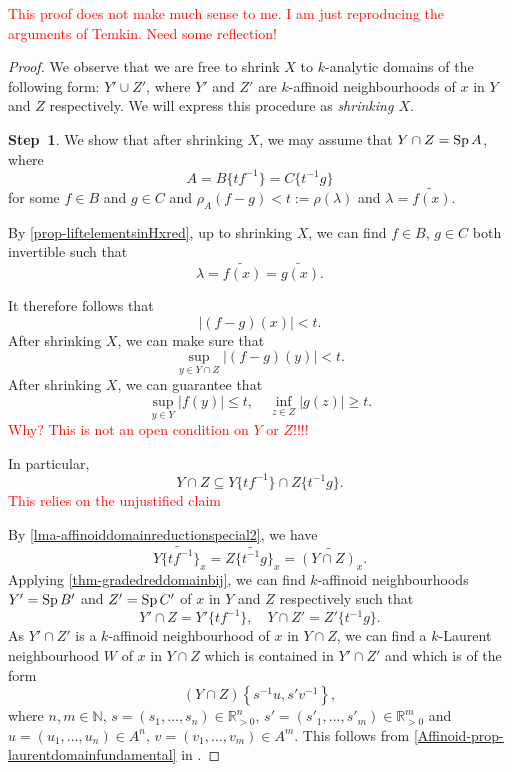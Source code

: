 \textcolor{red}{This proof does not make much sense to me. I am just reproducing the arguments of Temkin. Need some reflection!}


\begin{proof}
    We observe that we are free to shrink $X$ to $k$-analytic domains of the following form: $Y'\cup Z'$, where $Y'$ and $Z'$ are $k$-affinoid neighbourhoods of $x$ in $Y$ and $Z$ respectively. We will express this procedure as \emph{shrinking $X$}.

    \textbf{Step~1}. We show that after shrinking $X$, we may assume that $Y\cap Z=\operatorname{Sp} A$, where
    \[
        A=B\{tf^{-1}\}=C\{t^{-1}g\}  
    \]
    for some $f\in B$ and $g\in C$ and $\rho_A(f-g)<t:=\rho(\lambda)$ and $\lambda=\widetilde{f(x)}$.



    By \cref{prop-liftelementsinHxred}, up to shrinking $X$, we can find $f\in B$, $g\in C$ both invertible such that 
    \[
        \lambda=\widetilde{f(x)}=\widetilde{g(x)}.
    \]
     

    It therefore follows that 
    \[
        |(f-g)(x)|<t.  
    \] 
    After shrinking $X$, we can make sure that 
    \[
        \sup_{y\in Y\cap Z}|(f-g)(y)|<t.
    \]
    After shrinking $X$, we can guarantee that
    \[
        \sup_{y\in Y} |f(y)|\leq t,\quad \inf_{z\in Z}|g(z)|\geq t.
    \]
     \textcolor{red}{Why? This is not an open condition on $Y$ or $Z$!!!!}  
    
    In particular,
    \[  
        Y\cap Z\subseteq Y\{tf^{-1}\}\cap Z\{t^{-1}g\}.
    \]
    \textcolor{red}{This relies on the unjustified claim}

    By \cref{lma-affinoiddomainreductionspecial2}, we have
    \[
        \widetilde{Y\{tf^{-1}\}_x}= \widetilde{Z\{t^{-1}g\}_x}= \widetilde{(Y\cap Z)_x}.
    \]
    Applying \cref{thm-gradedreddomainbij}, we can find $k$-affinoid neighbourhoods $Y'=\operatorname{Sp} B'$ and $Z'=\operatorname{Sp} C'$ of $x$ in $Y$ and $Z$ respectively such that
    \[
        Y'\cap Z=Y'\{tf^{-1}\},\quad Y\cap Z'=Z'\{t^{-1}g\}. 
    \]
    As $Y'\cap Z'$ is a $k$-affinoid neighbourhood of $x$ in $Y\cap Z$, we can find a $k$-Laurent neighbourhood $W$ of $x$ in $Y\cap Z$ which is contained in $Y'\cap Z'$ and which is of the form
    \[
        (Y\cap Z)\left\{s^{-1}u,s'v^{-1}\right\},  
    \]
    where $n,m\in \mathbb{N}$, $s=(s_1,\ldots,s_n)\in \mathbb{R}_{>0}^n$, $s'=(s'_1,\ldots,s'_m)\in \mathbb{R}_{>0}^m$ and $u=(u_1,\ldots,u_n)\in A^n$, $v=(v_1,\ldots,v_m)\in A^m$. This follows from \cref{Affinoid-prop-laurentdomainfundamental} in .



\end{proof}
